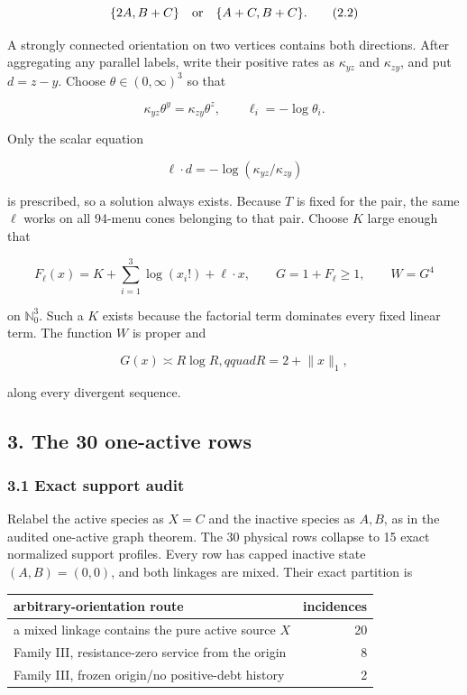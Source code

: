 \[
 \{2A,B+C\}\quad\hbox{or}\quad\{A+C,B+C\}.           \tag{2.2}
\]

A strongly connected orientation on two vertices contains both
directions. After aggregating any parallel labels, write their positive
rates as \(\kappa_{yz}\) and \(\kappa_{zy}\), and put \(d=z-y\). Choose
\(\theta\in(0,\infty)^3\) so that

\[
 \kappa_{yz}\theta^y=\kappa_{zy}\theta^z,
 \qquad
 \ell_i=-\log\theta_i.                              \tag{2.3}
\]

Only the scalar equation

\[
 \ell\mathbin\cdot d
   =-\log(\kappa_{yz}/\kappa_{zy})                   \tag{2.4}
\]

is prescribed, so a solution always exists. Because \(T\) is fixed for
the pair, the same \(\ell\) works on all 94-menu cones belonging to that
pair. Choose \(K\) large enough that

\[
 F_\ell(x)=K+\sum_{i=1}^3\log(x_i!)+\ell\mathbin\cdot x,
 \qquad G=1+F_\ell\ge1,
 \qquad W=G^4                                           \tag{2.5}
\]

on \(\mathbb N_0^3\). Such a \(K\) exists because the factorial term
dominates every fixed linear term. The function \(W\) is proper and

\[
 G(x)\asymp R\log R,qquad R=2+\lVert x\rVert_1,      \tag{2.6}
\]

along every divergent sequence.

\subsection{3. The 30 one-active rows}

\subsubsection{3.1 Exact support audit}

Relabel the active species as \(X=C\) and the inactive species as
\(A,B\), as in the audited one-active graph theorem. The 30 physical
rows collapse to 15 exact normalized support profiles. Every row has
capped inactive state \((A,B)=(0,0)\), and both linkages are mixed.
Their exact partition is

{\small{} %
\begin{longtable}[]{@{}lr@{}}
\toprule\noalign{}
arbitrary-orientation route & incidences \\
\midrule\noalign{}
\endhead
\bottomrule\noalign{}
\endlastfoot
a mixed linkage contains the pure active source \(X\) & 20 \\
Family III, resistance-zero service from the origin & 8 \\
Family III, frozen origin/no positive-debt history & 2 \\
\end{longtable}
}

